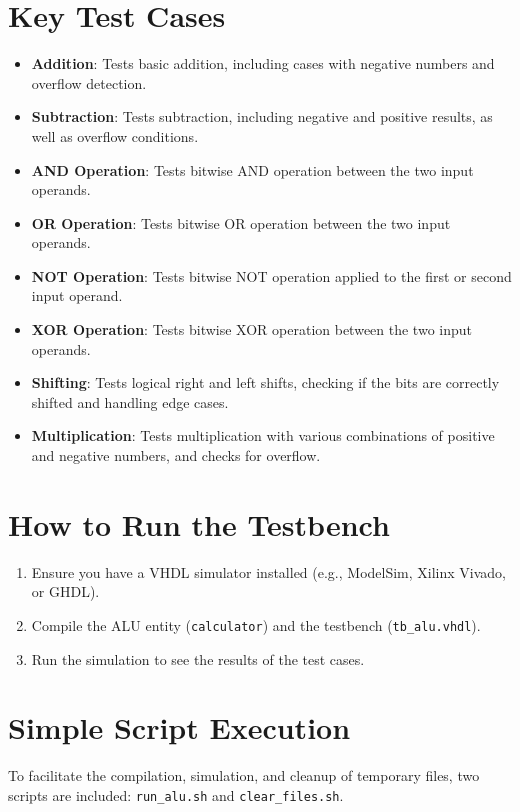 \documentclass{article}
\begin{document}
\section{Key Test Cases}
\begin{itemize}
    \item \textbf{Addition}: Tests basic addition, including cases with negative numbers and overflow detection.
    \item \textbf{Subtraction}: Tests subtraction, including negative and positive results, as well as overflow conditions.
    \item \textbf{AND Operation}: Tests bitwise AND operation between the two input operands.
    \item \textbf{OR Operation}: Tests bitwise OR operation between the two input operands.
    \item \textbf{NOT Operation}: Tests bitwise NOT operation applied to the first or second input operand.
    \item \textbf{XOR Operation}: Tests bitwise XOR operation between the two input operands.
    \item \textbf{Shifting}: Tests logical right and left shifts, checking if the bits are correctly shifted and handling edge cases.
    \item \textbf{Multiplication}: Tests multiplication with various combinations of positive and negative numbers, and checks for overflow.
\end{itemize}
\section{How to Run the Testbench}
\begin{enumerate}
    \item Ensure you have a VHDL simulator installed (e.g., ModelSim, Xilinx Vivado, or GHDL).
    \item Compile the ALU entity (\texttt{calculator}) and the testbench (\texttt{tb\_alu.vhdl}).
    \item Run the simulation to see the results of the test cases.
\end{enumerate}

\section{Simple Script Execution}
To facilitate the compilation, simulation, and cleanup of temporary files, two scripts are included: \texttt{run\_alu.sh} and \texttt{clear\_files.sh}.
\end{document}
